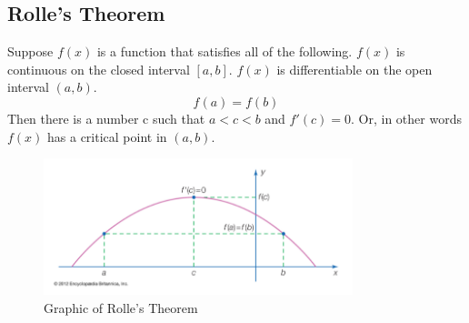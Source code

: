\documentclass{article}
\newcommand{\comment}[1]{}
\begin{document}
    \comment{
    \section*{Rolle's Thorem}
    Let $f$ be a continuous function on $[a, b]$ and differentiable on $]a, b[$ such that $f(a) = f(b)$. Then there exists $c \in ]a, b[ $ such that $f'(c) = 0$.

    This theorem will be admitted because its proof requires results which are not seen in this course. If $f$ is the constant function, the result is obvious. Otherwise, since $f$ is continuous over $[a, b]$, $f$ is bounded over $[a, b]$
    and reaches its bounds. This means that there exists $m \in  [a, b] $ and $M \in  [a, b] $ such that $\forall x \in  [a, b]$, $f(m) \leqslant  f(x) \leqslant f(M) (f(m) \neq  f(M)$ because $f$ is not a constant function$)$. As $f(a) = f(b)$, then we have the following cases:

    \begin{enumerate}
        \item if $m = a$ or $m = b$, then $M \in  ]a, b[$, hence we have $c = M$;
        \item if $M = a$ or $M = b$, then $m \in  ]a, b[$, hence we have $c = m$;
        \item $m \in  ]a, b[$ and $M \in  ]a, b[$, hence we have $c = m$ or $c = M$.
    \end{enumerate}

    So in all cases $f$ admits a local extremum at a point $c$ of $]a, b[$ and is differentiable on $]a, b[$, hence, according to the proposition 22, $f'(c) = 0$.
    \section*{Hint}
    Use $g : x \rightarrow  e^ {\alpha x} $
    }

    \subsection{Rolle's Theorem}
    Suppose $f(x)$ is a function that satisfies all of the following.
    $f(x)$ is continuous on the closed interval $[a,b]$.
    $f(x)$ is differentiable on the open interval $(a,b)$.
    $$f(a) = f(b)$$
    Then there is a number c such that $a<c<b$ and $f'(c)=0$. Or, in other words $f(x)$ has a critical point in $(a,b)$.

    \begin{figure}[htb]
        \centering
        \includegraphics[width=340px]{img/rollestheorem.png}
        \caption{Graphic of Rolle's Theorem}
    \end{figure}
\end{document}
